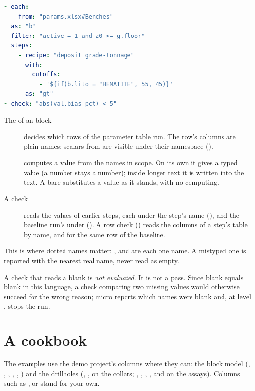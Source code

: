 \begin{lstlisting}[language=yaml]
- each:
    from: "params.xlsx#Benches"
  as: "b"
  filter: "active = 1 and z0 >= g.floor"
  steps:
    - recipe: "deposit grade-tonnage"
      with:
        cutoffs:
          - '${if(b.lito = "HEMATITE", 55, 45)}'
      as: "gt"
- check: "abs(val.bias_pct) < 5"
\end{lstlisting}

\begin{description}
\item[The  of an  block] decides which rows of the parameter table run.
  The row's columns are plain names; scalars from  are visible under their namespace
  ().
\item[] computes a value from the names in scope. On its own it gives a typed value (a
  number stays a number); inside longer text it is written into the text. A bare 
  substitutes a value as it stands, with no computing.
\item[A check] reads the values of earlier steps, each under the step's  name
  (), and the baseline run's under  (). A
  row check () reads the columns of a step's table by name, and  for
  the same row of the baseline.
\end{description}

This is where dotted names matter: ,  and  are
each one name. A mistyped one is reported with the nearest real name, never read as empty.

\begin{note}
A check that reads a blank is \emph{not evaluated}. It is not a pass. Since blank equals blank in
this language, a check comparing two missing values would otherwise succeed for the wrong reason;
micro reports which names were blank and, at level , stops the run.
\end{note}

\section{A cookbook}\label{sec:expr-cookbook}

The examples use the demo project's columns where they can: the block model 
(, , , , , ) and the drillholes (,
,  on the collars; , , , , 
and  on the assays). Columns such as ,
 or  stand for your own.

